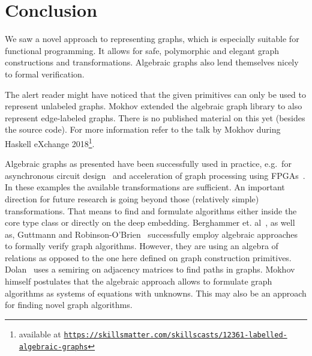 \documentclass{article}
\begin{document}
\section{Conclusion}\label{sec:conclusion}
We saw a novel approach to representing graphs, which is especially suitable for
functional programming. It allows for safe, polymorphic and elegant graph
constructions and transformations. Algebraic graphs also lend themselves nicely
to formal verification.

The alert reader might have noticed that the given primitives can only be used
to represent unlabeled graphs. Mokhov extended the algebraic graph library to
also represent edge-labeled graphs. There is no published material on this yet
(besides the source code). For more information refer to the talk by Mokhov
during Haskell eXchange 2018\footnote{available at
  \texttt{\href{https://skillsmatter.com/skillscasts/12361-labelled-algebraic-graphs}{https://skillsmatter.com/skillscasts/12361-labelled-algebraic-graphs}}}.

Algebraic graphs as presented have been successfully used in practice, e.g.\ for
asynchronous circuit design~\cite{beaumont2017high} and acceleration of graph
processing using FPGAs~\cite{mokhov2019language}. In these examples
the available transformations are sufficient. An important direction for future
research is going beyond those (relatively simple) transformations. That means
to find and formulate algorithms either inside the core type class or directly
on the deep embedding. Berghammer et. al~\cite{berghammer2020relational}, as well
as, Guttmann and Robinson-O'Brien~\cite{Relational_Minimum_Spanning_Trees-AFP}
successfully employ algebraic approaches to formally verify graph algorithms.
However, they are using an algebra of relations as opposed to the one here
defined on graph construction primitives. Dolan~\cite{dolan2013fun} uses a
semiring on adjacency matrices to find paths in graphs.
Mokhov himself postulates that the algebraic approach allows to formulate graph
algorithms as systems of equations with unknowns. This may also be an approach
for finding novel graph algorithms.

\printbibliography
\end{document}
